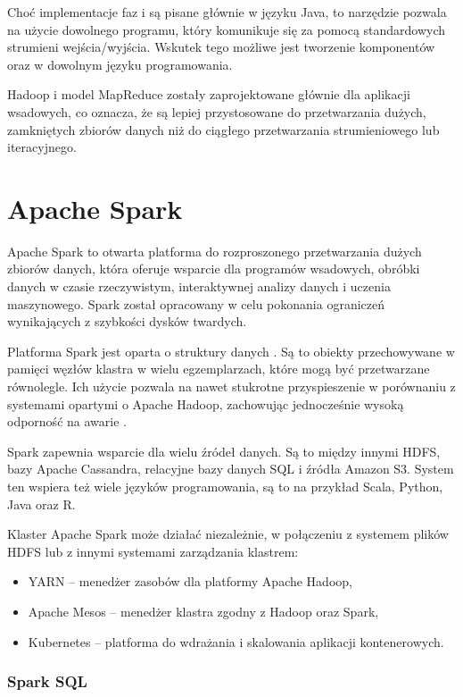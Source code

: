 Choć implementacje faz  i  są pisane głównie w języku Java, to
narzędzie  pozwala na użycie dowolnego programu, który komunikuje się
za pomocą standardowych strumieni wejścia/wyjścia. Wskutek tego możliwe jest tworzenie
komponentów  oraz  w dowolnym języku programowania.

Hadoop i model MapReduce zostały zaprojektowane głównie dla aplikacji wsadowych, co oznacza,
że są lepiej przystosowane do przetwarzania dużych, zamkniętych zbiorów danych niż do ciągłego
przetwarzania strumieniowego lub iteracyjnego.

\section{Apache Spark}

Apache Spark to otwarta platforma do rozproszonego przetwarzania dużych zbiorów danych,
która oferuje wsparcie dla programów wsadowych, obróbki danych w czasie rzeczywistym,
interaktywnej analizy danych i uczenia maszynowego. Spark został opracowany w celu pokonania
ograniczeń wynikających z szybkości dysków twardych.

Platforma Spark jest oparta o struktury danych .
Są to obiekty przechowywane w pamięci węzłów klastra w wielu egzemplarzach, które mogą być
przetwarzane równolegle. Ich użycie pozwala na nawet stukrotne przyspieszenie w porównaniu z
systemami opartymi o Apache Hadoop, zachowując jednocześnie wysoką odporność na awarie \cite{big-data-3}.

Spark zapewnia wsparcie dla wielu źródeł danych. Są to między innymi HDFS, bazy Apache
Cassandra, relacyjne bazy danych SQL i źródła Amazon S3. System ten wspiera też wiele
języków programowania, są to na przykład Scala, Python, Java oraz R.

Klaster Apache Spark może działać niezależnie, w połączeniu z systemem plików HDFS lub
z innymi systemami zarządzania klastrem:
\begin{itemize}
      \item YARN -- menedżer zasobów dla platformy Apache Hadoop,
      \item Apache Mesos -- menedżer klastra zgodny z Hadoop oraz Spark,
      \item Kubernetes -- platforma do wdrażania i skalowania aplikacji kontenerowych.
\end{itemize}

\subsubsection*{Spark SQL}


